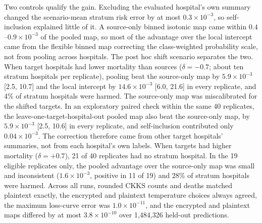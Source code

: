 \documentclass[11pt]{article}
\begin{document}
Two controls qualify the gain. Excluding the evaluated hospital's own summary changed the scenario-mean stratum risk error by at most $0.3\times10^{-3}$, so self-inclusion explained little of it. A source-only binned isotonic map came within $0.4$--$0.9\times10^{-3}$ of the pooled map, so most of the advantage over the local intercept came from the flexible binned map correcting the class-weighted probability scale, not from pooling across hospitals. The post hoc shift scenario separates the two. When target hospitals had lower mortality than sources ($\delta=-0.7$; about ten stratum hospitals per replicate), pooling beat the source-only map by $5.9\times10^{-3}$ [2.5, 10.7] and the local intercept by $14.6\times10^{-3}$ [6.0, 21.6] in every replicate, and 4\% of stratum hospitals were harmed. The source-only map was miscalibrated for the shifted targets. In an exploratory paired check within the same 40 replicates, the leave-one-target-hospital-out pooled map also beat the source-only map, by $5.9\times10^{-3}$ [2.5, 10.6] in every replicate, and self-inclusion contributed only $0.04\times10^{-3}$. The correction therefore came from other target hospitals' summaries, not from each hospital's own labels. When targets had higher mortality ($\delta=+0.7$), 21 of 40 replicates had no stratum hospital. In the 19 eligible replicates only, the pooled advantage over the source-only map was small and inconsistent ($1.6\times10^{-3}$, positive in 11 of 19) and 28\% of stratum hospitals were harmed. Across all runs, rounded CKKS counts and deaths matched plaintext exactly, the encrypted and plaintext temperature choices always agreed, the maximum loss-curve error was $1.0\times10^{-11}$, and the encrypted and plaintext maps differed by at most $3.8\times10^{-10}$ over 1,484,326 held-out predictions.
\end{document}
